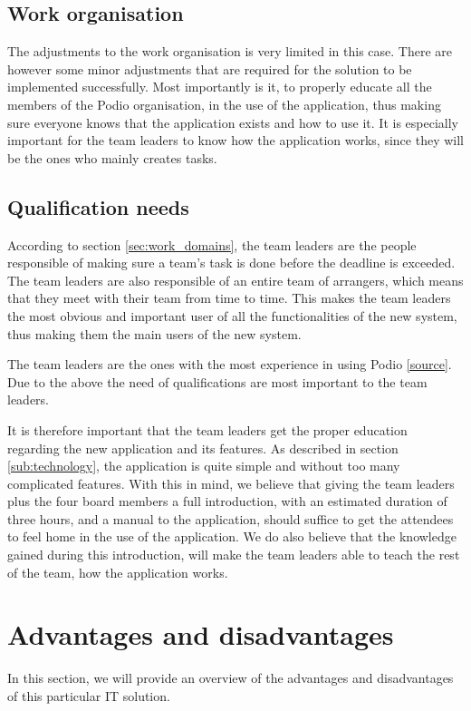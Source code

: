 \subsection{Work organisation}
\label{sub:work_organisation}
The adjustments to the work organisation is very limited in this case. There are however some
minor adjustments that are required for the solution to be implemented successfully. 
Most importantly is it, to properly educate all the members of the Podio organisation, in the use of
the application, thus making sure everyone knows that the application exists and how to use it. It
is especially important for the team leaders to know how the application works, since they will be
the ones who mainly creates tasks. 

\subsection{Qualification needs}
\label{sub:qualification_needs}
According to section \ref{sec:work_domains}, the team leaders are the people responsible of making
sure a team's task is done before the deadline is exceeded. The team leaders are also responsible
of an entire team of arrangers, which means that they meet with their team from time to time. This
makes the team leaders the most obvious and important user of all the functionalities of the new
system, thus making them the main users of the new system. 

The team leaders are the ones with the most experience in using Podio \ref{source}. Due to the above
the need of qualifications are most important to the team leaders. 

It is therefore important that the team leaders get the proper education regarding the new
application and its features. As described in section \ref{sub:technology}, the application is quite
simple and without too many complicated features. With this in mind, we believe that giving the team
leaders plus the four board members a full introduction, with an estimated duration of three hours,
and a manual to the application, should suffice to get the attendees to feel home in the use of the
application. We do also believe that the knowledge gained during this introduction, will make the
team leaders able to teach the rest of the team, how the application works.

\section{Advantages and disadvantages}
\label{sec:advantages_disadvantages}
In this section, we will provide an overview of the advantages and disadvantages of this particular
IT solution.


